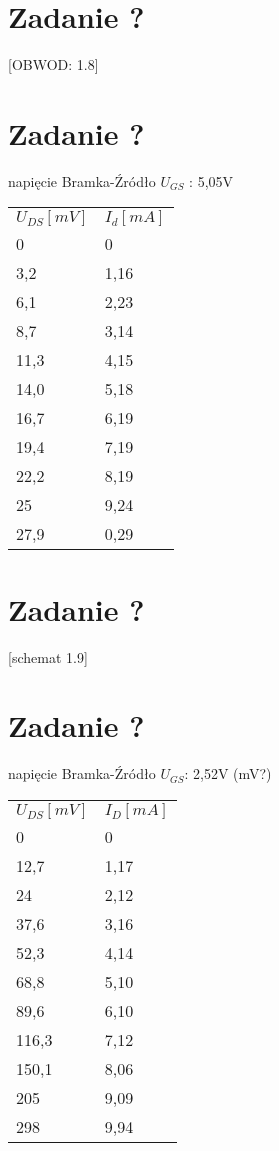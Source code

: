 \documentclass[polish,a4paper]{article}
\begin{document}
\section{Zadanie ?}
[OBWOD: 1.8]

\section{Zadanie ?}
napięcie Bramka-Źródło $U_{GS}$ : 5,05V


\begin{center}
\begin{tabular}{|l|l|}
\hline
\textbf{$U_{DS} [mV]$} & \textbf{$I_d [mA]$}\\
\hhline{|=|=|}

0 & 0\\
\hline
3,2 & 1,16 \\
\hline
6,1 & 2,23 \\
\hline
8,7 & 3,14 \\
\hline
11,3 & 4,15 \\
\hline
14,0 & 5,18 \\
\hline
16,7 & 6,19 \\
\hline
19,4 & 7,19 \\
\hline
22,2 & 8,19 \\
\hline
25 & 9,24 \\
\hline
27,9 & 0,29 \\
\hline

\end{tabular}
\end{center}


\section{Zadanie ?}
[schemat 1.9]

\section{Zadanie ?}

napięcie Bramka-Źródło $U_{GS}$: 2,52V (mV?)

\begin{center}
\begin{tabular}{|l|l|}
\hline
\textbf{$U_{DS} [mV]$} & \textbf{$I_D [mA]$}\\
\hhline{|=|=|}
0 & 0 \\
\hline
12,7 & 1,17 \\
\hline
24 & 2,12 \\
\hline
37,6 & 3,16 \\
\hline
52,3 & 4,14 \\
\hline
68,8 & 5,10 \\
\hline
89,6 & 6,10 \\
\hline
116,3 & 7,12 \\
\hline
150,1 & 8,06 \\
\hline
205 & 9,09 \\
\hline
298& 9,94 \\
\hline

\end{tabular}
\end{center}
\end{document}
